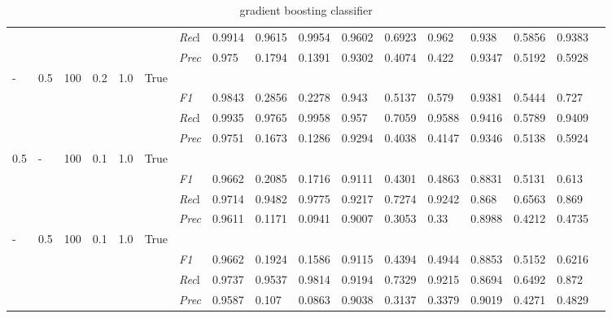 \begin{table}[]
\begin{tabularx}{\textwidth}{XXXXXX|X|XXX|XXX|XXXX}
    & & & & & & \textit{Rec}l & 0.9914 & 0.9615 & 0.9954    & 0.9602 & 0.6923    & 0.962    & 0.938    & 0.5856    & 0.9383    \\
    & & & & & & \textit{Prec} & 0.975 & 0.1794 & 0.1391 & 0.9302 & 0.4074 & 0.422 & 0.9347 & 0.5192 & 0.5928 \\ \midrule
    - & 0.5 & 100 & 0.2 & 1.0 &True & & & & & & & & & \\
    & & & & & & \textit{F1} & 0.9843 & 0.2856 & 0.2278 & 0.943 & 0.5137        & 0.579        & 0.9381        & 0.5444        & 0.727        \\
    & & & & & & \textit{Rec}l & 0.9935 & 0.9765 & 0.9958    & 0.957 & 0.7059    & 0.9588    & 0.9416    & 0.5789    & 0.9409    \\
    & & & & & & \textit{Prec} & 0.9751 & 0.1673 & 0.1286 & 0.9294 & 0.4038 & 0.4147 & 0.9346 & 0.5138 & 0.5924 \\ \midrule
    0.5 & - & 100 & 0.1 & 1.0 &True & & & & & & & & & \\
    & & & & & & \textit{F1} & 0.9662 & 0.2085 & 0.1716 & 0.9111 & 0.4301        & 0.4863        & 0.8831        & 0.5131        & 0.613        \\
    & & & & & & \textit{Rec}l & 0.9714 & 0.9482 & 0.9775    & 0.9217 & 0.7274    & 0.9242    & 0.868    & 0.6563    & 0.869    \\
    & & & & & & \textit{Prec} & 0.9611 & 0.1171 & 0.0941 & 0.9007 & 0.3053 & 0.33 & 0.8988 & 0.4212 & 0.4735 \\ \midrule
    - & 0.5 & 100 & 0.1 & 1.0 &True & & & & & & & & & \\
    & & & & & & \textit{F1} & 0.9662 & 0.1924 & 0.1586 & 0.9115 & 0.4394        & 0.4944        & 0.8853        & 0.5152        & 0.6216        \\
    & & & & & & \textit{Rec}l & 0.9737 & 0.9537 & 0.9814    & 0.9194 & 0.7329    & 0.9215    & 0.8694    & 0.6492    & 0.872    \\
    & & & & & & \textit{Prec} & 0.9587 & 0.107 & 0.0863 & 0.9038 & 0.3137 & 0.3379 & 0.9019 & 0.4271 & 0.4829 \\ \midrule
    \end{tabularx}
    \caption{gradient boosting classifier}
    \label{tab:all_results_gradient_boosting_classifier}
    \end{table}
    
